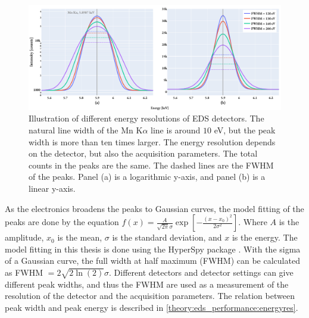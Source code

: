 \begin{figure}[ht]
    \centering
    \includegraphics[width=0.95\linewidth]{figures/eds_energyResolutionsMnKa.pdf}
    \caption{
        Illustration of different energy resolutions of EDS detectors.
        The natural line width of the Mn K$\alpha$ line is around $10$ eV, but the peak width is more than ten times larger.
        The energy resolution depends on the detector, but also the acquisition parameters.
        The total counts in the peaks are the same.
        The dashed lines are the FWHM of the peaks.
        Panel (a) is a logarithmic y-axis, and panel (b) is a linear y-axis.
    }
    \label{fig:theory:energy_resolution}
\end{figure}





As the electronics broadens the peaks to Gaussian curves, the model fitting of the peaks are done by the equation $f(x) = \frac{A}{\sqrt{2\pi}\sigma}\exp\left[{-\frac{(x-x_0)^2}{2\sigma^2}}\right]$.
% 
% 
Where $A$ is the amplitude, $x_0$ is the mean, $\sigma$ is the standard deviation, and $x$ is the energy.
The model fitting in this thesis is done using the HyperSpy package \cite{hyperspy_1.7.1}.
With the sigma of a Gaussian curve, the full width at half maximum (FWHM) can be calculated as FWHM $= 2\sqrt{2\ln(2)}\sigma$.
Different detectors and detector settings can give different peak widths, and thus the FWHM are used as a measurement of the resolution of the detector and the acquisition parameters.
The relation between peak width and peak energy is described in \cref{theory:eds_performance:energyres}. %































